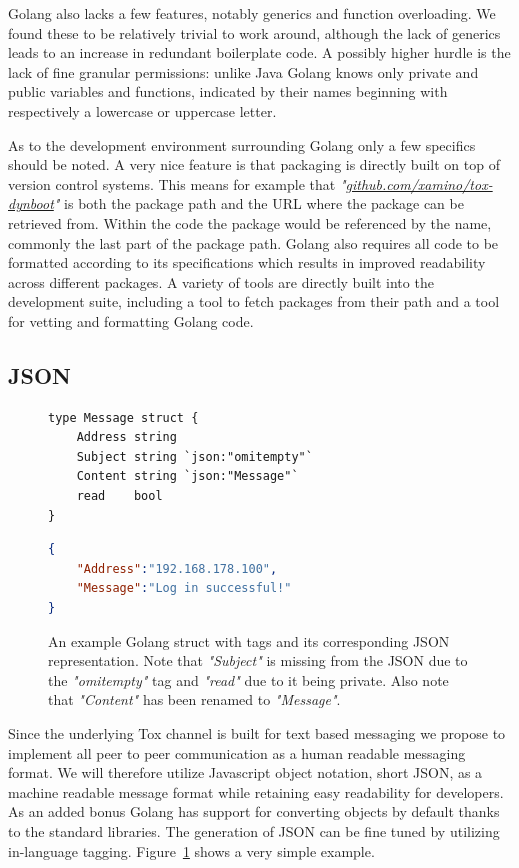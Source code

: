 Golang also lacks a few features, notably generics and function overloading.
We found these to be relatively trivial to work around, although the lack of generics leads to an increase in redundant boilerplate code.
A possibly higher hurdle is the lack of fine granular permissions: unlike Java Golang knows only private and public variables and functions, indicated by their names beginning with respectively a lowercase or uppercase letter.

As to the development environment surrounding Golang only a few specifics should be noted.
A very nice feature is that packaging is directly built on top of version control systems.
This means for example that \textit{"\href{https://github.com/xamino/tox-dynboot}{github.com/xamino/tox-dynboot}"} is both the package path and the URL where the package can be retrieved from.
Within the code the package would be referenced by the name, commonly the last part of the package path.
Golang also requires all code to be formatted according to its specifications which results in improved readability across different packages.
A variety of tools are directly built into the development suite, including a tool to fetch packages from their path and a tool for vetting and formatting Golang code.

\subsection{JSON}
\label{sub:JSON}

\begin{figure}[htp]
    \begin{lstlisting}[language=golang,firstnumber=0]
type Message struct {
    Address string
    Subject string `json:"omitempty"`
    Content string `json:"Message"`
    read    bool
}
    \end{lstlisting}
    \begin{lstlisting}[language=json,firstnumber=0]
{
    "Address":"192.168.178.100",
    "Message":"Log in successful!"
}
    \end{lstlisting}
\caption[Golang JSON Example]{
    An example Golang struct with tags and its corresponding JSON representation.
    Note that \textit{"Subject"} is missing from the JSON due to the \textit{"omitempty"} tag and \textit{"read"} due to it being private.
    Also note that \textit{"Content"} has been renamed to \textit{"Message"}.
}
\label{golang:json_example}
\end{figure}

Since the underlying Tox channel is built for text based messaging we propose to implement all peer to peer communication as a human readable messaging format.
We will therefore utilize Javascript object notation, short JSON, as a machine readable message format while retaining easy readability for developers.
As an added bonus Golang has support for converting objects by default thanks to the standard libraries.
The generation of JSON can be fine tuned by utilizing in-language tagging.
Figure~\ref{golang:json_example} shows a very simple example.

